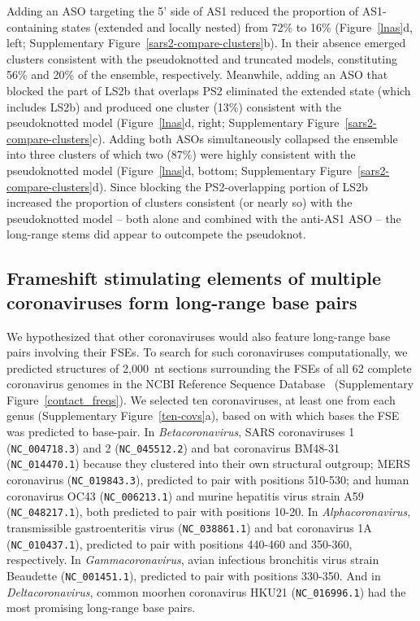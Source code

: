 \documentclass[main.tex]{subfiles}
\begin{document}
Adding an ASO targeting the 5' side of AS1 reduced the proportion of AS1-containing states (extended and locally nested) from 72\% to 16\% (Figure~\ref{lnas}d, left; Supplementary Figure~\ref{sars2-compare-clusters}b).
In their absence emerged clusters consistent with the pseudoknotted and truncated models, constituting 56\% and 20\% of the ensemble, respectively.
Meanwhile, adding an ASO that blocked the part of LS2b that overlaps PS2 eliminated the extended state (which includes LS2b) and produced one cluster (13\%) consistent with the pseudoknotted model (Figure~\ref{lnas}d, right; Supplementary Figure~\ref{sars2-compare-clusters}c).
Adding both ASOs simultaneously collapsed the ensemble into three clusters of which two (87\%) were highly consistent with the pseudoknotted model (Figure~\ref{lnas}d, bottom; Supplementary Figure~\ref{sars2-compare-clusters}d).
Since blocking the PS2-overlapping portion of LS2b increased the proportion of clusters consistent (or nearly so) with the pseudoknotted model -- both alone and combined with the anti-AS1 ASO -- the long-range stems did appear to outcompete the pseudoknot.

\subsection{Frameshift stimulating elements of multiple coronaviruses form long-range base pairs}

We hypothesized that other coronaviruses would also feature long-range base pairs involving their FSEs.
To search for such coronaviruses computationally, we predicted structures of 2,000~nt sections surrounding the FSEs of all 62 complete coronavirus genomes in the NCBI Reference Sequence Database~\cite{OLeary2016} (Supplementary Figure~\ref{contact_freqs}).
We selected ten coronaviruses, at least one from each genus (Supplementary Figure~\ref{ten-covs}a), based on with which bases the FSE was predicted to base-pair.
In \textit{Betacoronavirus}, SARS coronaviruses 1 (\verb|NC_004718.3|) and 2 (\verb|NC_045512.2|) and bat coronavirus BM48-31 (\verb|NC_014470.1|) because they clustered into their own structural outgroup; MERS coronavirus (\verb|NC_019843.3|), predicted to pair with positions 510-530; and human coronavirus OC43 (\verb|NC_006213.1|) and murine hepatitis virus strain A59 (\verb|NC_048217.1|), both predicted to pair with positions 10-20.
In \textit{Alphacoronavirus}, transmissible gastroenteritis virus (\verb|NC_038861.1|) and bat coronavirus 1A (\verb|NC_010437.1|), predicted to pair with positions 440-460 and 350-360, respectively.
In \textit{Gammacoronavirus}, avian infectious bronchitis virus strain Beaudette (\verb|NC_001451.1|), predicted to pair with positions 330-350.
And in \textit{Deltacoronavirus}, common moorhen coronavirus HKU21 (\verb|NC_016996.1|) had the most promising long-range base pairs.
\end{document}
